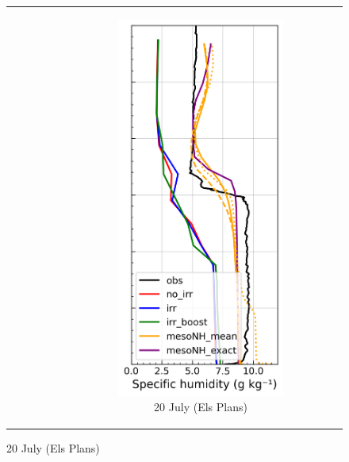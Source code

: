 \begin{figure}[hbtp]
{\begin{tabular}{@{}cccc@{}}
\begin{subfigure}[t]{0.285\textwidth}
        \end{subfigure} &
        \begin{subfigure}[t]{0.29\textwidth}
            \caption{20 July (Els Plans)}
            \includegraphics[width=\textwidth]{images/chap5/profiles/profile_elsplans_ovap_2007_sensbins.png}

\end{subfigure}
\end{tabular}}
\end{figure}
